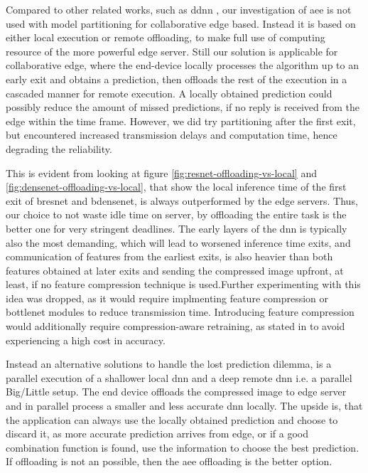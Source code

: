 Compared to other related works, such as \gls{ddnn} \cite{teerapittayanon_distributed_2017}, our investigation of \gls{aee} is not used with model partitioning for collaborative edge based. Instead it is based on either local execution or remote offloading, to make full use of computing resource of the more powerful edge server. Still our solution is applicable for collaborative edge, where the end-device locally processes the algorithm up to an early exit and obtains a prediction, then offloads the rest of the execution in a cascaded manner for remote execution. A locally obtained prediction could possibly reduce the amount of missed predictions, if no reply is received from the edge within the time frame. However, we did try partitioning after the first exit, but encountered increased transmission delays and computation time, hence degrading the reliability. 

This is evident from looking at figure \ref{fig:resnet-offloading-vs-local} and \ref{fig:densenet-offloading-vs-local}, that show the local inference time of the first exit of \gls{bresnet} and \gls{bdensenet}, is always outperformed by the edge servers. Thus, our choice to not waste idle time on server, by offloading the entire task is the better one for very stringent deadlines. The early layers of the \gls{dnn} is typically also the most demanding, which will lead to worsened inference time exits, and communication of features from the earliest exits, is also heavier than both  features obtained at later exits and sending the compressed image upfront, at least, if no feature compression technique is used.Further experimenting with this idea was dropped, as it would require implmenting feature compression or \gls{bottlenet} modules to reduce transmission time. Introducing feature compression would additionally require compression-aware retraining, as stated in \cite{choi_near-lossless_2018,choi_near-lossless_2018,eshratifar_bottlenet:_2019}  to avoid experiencing a high cost in accuracy.

Instead an alternative solutions to handle the lost prediction dilemma, is a parallel execution of a shallower local \gls{dnn} and a deep remote \gls{dnn} i.e. a parallel Big/Little setup. The end device offloads the compressed image to edge server and in parallel process a smaller and less accurate \gls{dnn} locally. The upside is, that the application can always use the locally obtained prediction and choose to discard it, as more accurate prediction arrives from edge, or if a good combination function is found, use the information to choose the best prediction. If offloading is not an possible, then the \gls{aee} offloading is the better option.

